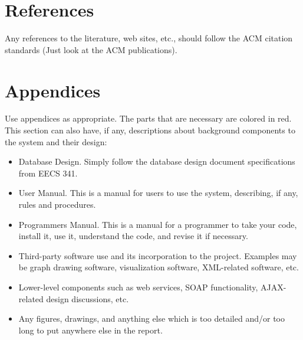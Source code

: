 \documentclass[letterpaper,12pt]{article}
\begin{document}
\section{References}
Any references to the literature, web sites, etc., should follow the ACM
citation standards (Just look at the ACM publications).
\newpage



\section{Appendices}
Use appendices as appropriate. The parts that are necessary are colored in red.
This section can also have, if any, descriptions about background components to
the system and their design:
\begin{itemize}
  \item Database Design.  Simply follow the database design document
  specifications from EECS 341.
  \item User Manual.  This is a manual for users to use the system, describing,
  if any, rules and procedures.
  \item Programmers Manual.  This is a manual for a programmer to take your
  code, install it, use it, understand the code, and revise it if necessary. 
  \item Third-party software use and its incorporation to the project.  Examples
  may be graph drawing software, visualization software, XML-related software, etc. 
  \item Lower-level components such as web services, SOAP functionality,
  AJAX-related design discussions, etc. 
  \item Any figures, drawings, and anything else which is too detailed and/or
  too long to put anywhere else in the report. 
\end{itemize}
\newpage
\end{document}

